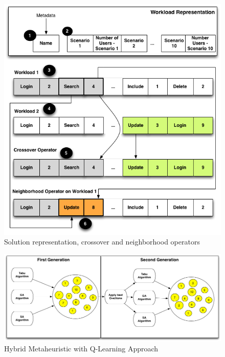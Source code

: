 \documentclass{bmcart}
\begin{document}
\begin{backmatter}
\begin{figure}[h]
\centering
\includegraphics{./images/genomere.png}
\caption{Solution representation, crossover  and neighborhood operators \citep{Gois2016}}
\label{fig:solution}
\end{figure}

\begin{figure}[h!]
\center
\includegraphics{./images/qhybrid.png}
\caption{Hybrid Metaheuristic with Q-Learning Approach}
\label{fig:hybridq}
\end{figure}


\end{backmatter}
\end{document}
